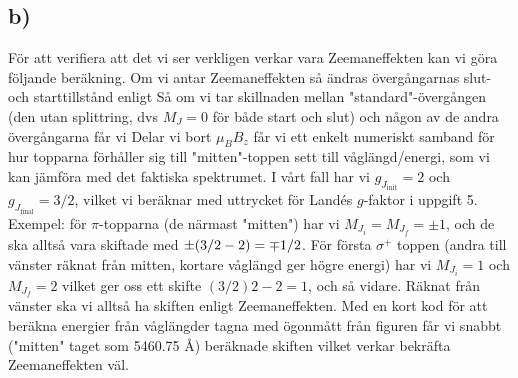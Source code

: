 \subsection{b)}
För att verifiera att det vi ser verkligen verkar vara Zeemaneffekten kan vi göra följande beräkning. Om vi antar Zeemaneffekten så ändras övergångarnas
slut- och starttillstånd enligt
Så om vi tar skillnaden mellan "standard"-övergången (den utan splittring, dvs $M_J = 0$ för både start och slut) och någon av de andra övergångarna får vi
Delar vi bort $\mu_B B_z$ får vi ett enkelt numeriskt samband för hur topparna förhåller sig till "mitten"-toppen sett till våglängd/energi, som vi kan jämföra
med det faktiska spektrumet. I vårt fall har vi $g_{J_\text{init}} = 2$ och $g_{J_\text{final}} = 3/2$, vilket vi beräknar med uttrycket
 för Landés $g$-faktor i uppgift 5. Exempel: för $\pi$-topparna (de närmast "mitten") har vi $M_{J_i} = M_{J_f} = \pm 1$, och de ska alltså vara skiftade med 
 $\pm \qty(3/2-2) = \mp 1/2$. För första $\sigma^+$ toppen (andra till vänster räknat från mitten, kortare våglängd ger högre energi) har vi $M_{J_i} = 1$ och $M_{J_f} = 2$ vilket ger oss
 ett skifte $(3/2)2-2 = 1$, och så vidare. Räknat från vänster ska vi alltså ha skiften
   enligt Zeemaneffekten. Med en
 kort kod för att beräkna energier från våglängder tagna med ögonmått från figuren får vi snabbt ("mitten" taget som 5460.75 Å) beräknade skiften
 vilket verkar bekräfta Zeemaneffekten väl.